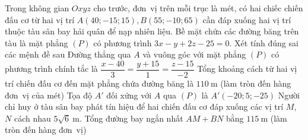 \begin{ex}%
	Trong  không gian $Oxyz$ cho trước, đơn~vị trên mỗi trục là mét, có hai chiếc chiến đấu cơ từ hai vị trí $A(40;-15; 15), B(55;-10; 65)$ cần đáp xuống hai vị trí thuộc tàu sân bay hải quân để nạp nhiên liệu. Bề mặt chứa các đường băng trên tàu là mặt phẳng $(P)$ có phương trình $3x-y+2z-25=0$.
	Xét tính đúng sai các mệnh đề sau 
	\choiceTF 
		{Đường thẳng qua $A$  và vuông góc với mặt phẳng $(P)$ có phương trình chính tắc là $\dfrac{x-40}{3}=\dfrac{y+15}{1}=\dfrac{z-15}{-2}$}
		{Tổng khoảng cách từ hai vị trí chiến đấu cơ đến mặt phẳng chứa đường  băng là $110~\mathrm{m}$ (làm tròn đến hàng đơn~vị của mét)}
		{\True Tọa độ $A'$ đối xứng với $A$  qua $(P)$ là $A'(-20; 5;-25)$}
		{\True Người chỉ huy ở tàu sân bay phát tín hiệu để hai chiến đấu cơ đáp xuống  các vị trí $M$, $N$ cách nhau $5\sqrt{6}~\mathrm{m}$. Tổng đường bay ngắn nhất $AM+BN$ bằng $115~\mathrm{m}$ (làm tròn đến hàng đơn~vị)}
\end{ex}
